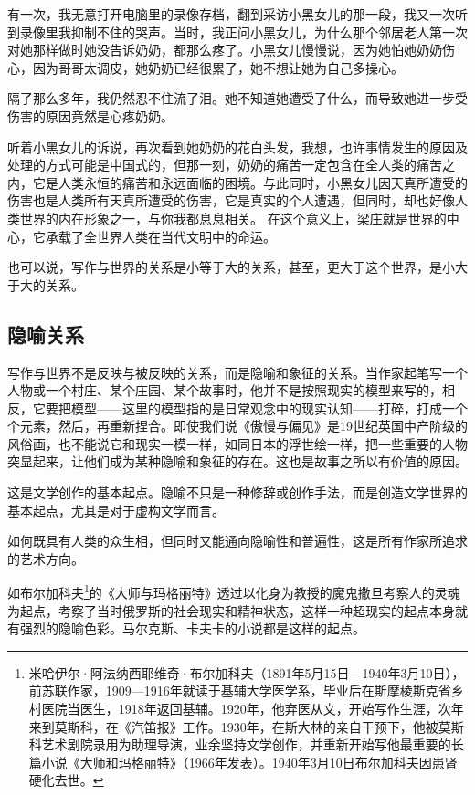 \documentclass[fontset=fandol,12pt,a5paper]{ctexbook}
\begin{document}
有一次，我无意打开电脑里的录像存档，翻到采访小黑女儿的那一段，我又一次听到录像里我抑制不住的哭声。当时，我正问小黑女儿，为什么那个邻居老人第一次对她那样做时她没告诉奶奶，都那么疼了。小黑女儿慢慢说，因为她怕她奶奶伤心，因为哥哥太调皮，她奶奶已经很累了，她不想让她为自己多操心。

隔了那么多年，我仍然忍不住流了泪。她不知道她遭受了什么，而导致她进一步受伤害的原因竟然是心疼奶奶。

听着小黑女儿的诉说，再次看到她奶奶的花白头发，我想，也许事情发生的原因及处理的方式可能是中国式的，但那一刻，奶奶的痛苦一定包含在全人类的痛苦之内，它是人类永恒的痛苦和永远面临的困境。与此同时，小黑女儿因天真所遭受的伤害也是人类所有天真所遭受的伤害，它是真实的个人遭遇，但同时，却也好像人类世界的内在形象之一，与你我都息息相关。
在这个意义上，梁庄就是世界的中心，它承载了全世界人类在当代文明中的命运。

也可以说，写作与世界的关系是小等于大的关系，甚至，更大于这个世界，是小大于大的关系。

\subsection{隐喻关系}
写作与世界不是反映与被反映的关系，而是隐喻和象征的关系。当作家起笔写一个人物或一个村庄、某个庄园、某个故事时，他并不是按照现实的模型来写的，相反，它要把模型——这里的模型指的是日常观念中的现实认知——打碎，打成一个个元素，然后，再重新捏合。即使我们说《傲慢与偏见》是19世纪英国中产阶级的风俗画，也不能说它和现实一模一样，如同日本的浮世绘一样，把一些重要的人物突显起来，让他们成为某种隐喻和象征的存在。这也是故事之所以有价值的原因。

这是文学创作的基本起点。隐喻不只是一种修辞或创作手法，而是创造文学世界的基本起点，尤其是对于虚构文学而言。

如何既具有人类的众生相，但同时又能通向隐喻性和普遍性，这是所有作家所追求的艺术方向。

如布尔加科夫\footnote{米哈伊尔·阿法纳西耶维奇·布尔加科夫（1891年5月15日—1940年3月10日），前苏联作家，1909—1916年就读于基辅大学医学系，毕业后在斯摩棱斯克省乡村医院当医生，1918年返回基辅。1920年，他弃医从文，开始写作生涯，次年来到莫斯科，在《汽笛报》工作。1930年，在斯大林的亲自干预下，他被莫斯科艺术剧院录用为助理导演，业余坚持文学创作，并重新开始写他最重要的长篇小说《大师和玛格丽特》（1966年发表）。1940年3月10日布尔加科夫因患肾硬化去世。}的《大师与玛格丽特》透过以化身为教授的魔鬼撒旦考察人的灵魂为起点，考察了当时俄罗斯的社会现实和精神状态，这样一种超现实的起点本身就有强烈的隐喻色彩。马尔克斯、卡夫卡的小说都是这样的起点。
\end{document}
